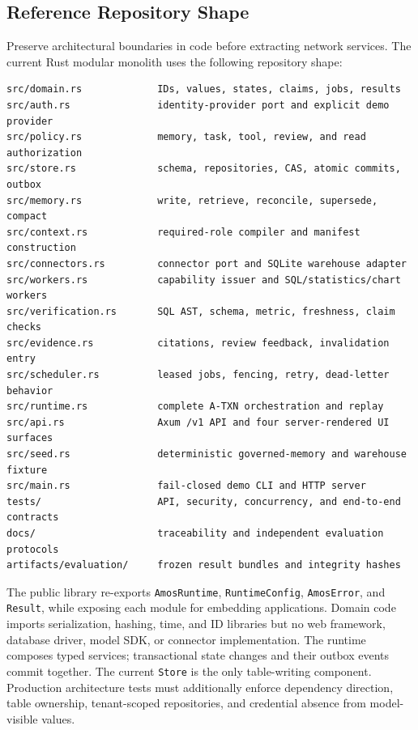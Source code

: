 \documentclass[10pt]{article}
\newcommand{\code}[1]{\texttt{#1}}
\begin{document}
\subsection{Reference Repository Shape}

Preserve architectural boundaries in code before extracting network services. The current Rust modular monolith uses the following repository shape:

\small
\begin{verbatim}
src/domain.rs             IDs, values, states, claims, jobs, results
src/auth.rs               identity-provider port and explicit demo provider
src/policy.rs             memory, task, tool, review, and read authorization
src/store.rs              schema, repositories, CAS, atomic commits, outbox
src/memory.rs             write, retrieve, reconcile, supersede, compact
src/context.rs            required-role compiler and manifest construction
src/connectors.rs         connector port and SQLite warehouse adapter
src/workers.rs            capability issuer and SQL/statistics/chart workers
src/verification.rs       SQL AST, schema, metric, freshness, claim checks
src/evidence.rs           citations, review feedback, invalidation entry
src/scheduler.rs          leased jobs, fencing, retry, dead-letter behavior
src/runtime.rs            complete A-TXN orchestration and replay
src/api.rs                Axum /v1 API and four server-rendered UI surfaces
src/seed.rs               deterministic governed-memory and warehouse fixture
src/main.rs               fail-closed demo CLI and HTTP server
tests/                    API, security, concurrency, and end-to-end contracts
docs/                     traceability and independent evaluation protocols
artifacts/evaluation/     frozen result bundles and integrity hashes
\end{verbatim}
\normalsize

\begin{samepage}
The public library re-exports \code{AmosRuntime}, \code{RuntimeConfig}, \code{AmosError}, and \code{Result}, while exposing each module for embedding applications. Domain code imports serialization, hashing, time, and ID libraries but no web framework, database driver, model SDK, or connector implementation. The runtime composes typed services; transactional state changes and their outbox events commit together. The current \code{Store} is the only table-writing component. Production architecture tests must additionally enforce dependency direction, table ownership, tenant-scoped repositories, and credential absence from model-visible values.
\end{samepage}
\end{document}

